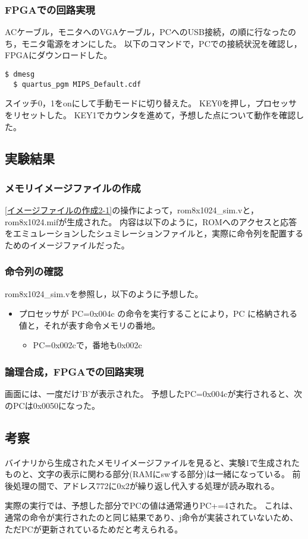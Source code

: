 \subsubsection{FPGAでの回路実現}
ACケーブル，モニタへのVGAケーブル，PCへのUSB接続，の順に行なったのち，モニタ電源をオンにした。
以下のコマンドで，PCでの接続状況を確認し，FPGAにダウンロードした。
\begin{lstlisting}[caption={FPGAでの回路実現},label={FPGAでの回路実現2-1}]
  $ dmesg
  $ quartus_pgm MIPS_Default.cdf
\end{lstlisting}

スイッチ0，1をonにして手動モードに切り替えた。
KEY0を押し，プロセッサをリセットした。
KEY1でカウンタを進めて，予想した点について動作を確認した。

\subsection{実験結果}
\subsubsection{メモリイメージファイルの作成}
\ref{イメージファイルの作成2-1}の操作によって，rom8x1024\_sim.vと，rom8x1024.mifが生成された。
内容は以下のように，ROMへのアクセスと応答をエミュレーションしたシュミレーションファイルと，実際に命令列を配置するためのイメージファイルだった。




\subsubsection{命令列の確認}
rom8x1024\_sim.vを参照し，以下のように予想した。
\begin{itemize}
  \item プロセッサが PC=0x004c の命令を実行することにより，PC に格納される値と，それが表す命令メモリの番地。
  \begin{itemize}
    \item PC=0x002cで，番地も0x002c
  \end{itemize}
\end{itemize}

\subsubsection{論理合成，FPGAでの回路実現}
画面には、一度だけ'B'が表示された。
予想したPC=0x004cが実行されると、次のPCは0x0050になった。

\subsection{考察}
バイナリから生成されたメモリイメージファイルを見ると、実験1で生成されたものと、文字の表示に関わる部分(RAMにswする部分)は一緒になっている。
前後処理の間で、アドレス772に0x2が繰り返し代入する処理が読み取れる。

実際の実行では、予想した部分でPCの値は通常通りPC+=4された。
これは、通常の命令が実行されたのと同じ結果であり、j命令が実装されていないため、ただPCが更新されているためだと考えられる。
